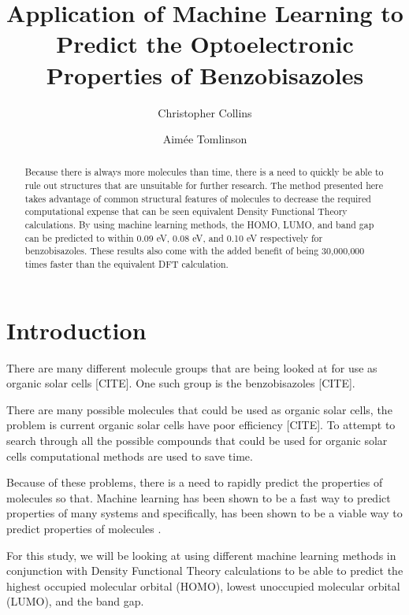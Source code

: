 \documentclass[10pt]{article}
\begin{document}
\title{Application of Machine Learning to Predict the Optoelectronic Properties of Benzobisazoles}
\author{Christopher Collins \and Aim\'{e}e Tomlinson}

\maketitle

\begin{abstract}
Because there is always more molecules than time, there is a need to quickly be able to rule out structures that are unsuitable for further research. The method presented here takes advantage of common structural features of molecules to decrease the required computational expense that can be seen equivalent Density Functional Theory calculations. By using machine learning methods, the HOMO, LUMO, and band gap can be predicted to within 0.09 eV, 0.08 eV, and 0.10 eV respectively for benzobisazoles. These results also come with the added benefit of being 30,000,000 times faster than the equivalent DFT calculation.
\end{abstract}

\section{Introduction}


There are many different molecule groups that are being looked at for use as organic solar cells [CITE]. One such group is the benzobisazoles [CITE].


There are many possible molecules that could be used as organic solar cells, the problem is current organic solar cells have poor efficiency [CITE]. To attempt to search through all the possible compounds that could be used for organic solar cells computational methods are used to save time.

Because of these problems, there is a need to rapidly predict the properties of molecules so that. Machine learning has been shown to be a fast way to predict properties of many systems and specifically, has been shown to be a viable way to predict properties of molecules\cite{hansen_assessment_2013} \cite{montavon_machine_2013}.

For this study, we will be looking at using different machine learning methods in conjunction with Density Functional Theory calculations to be able to predict the highest occupied molecular orbital (HOMO), lowest unoccupied molecular orbital (LUMO), and the band gap.
\end{document}
